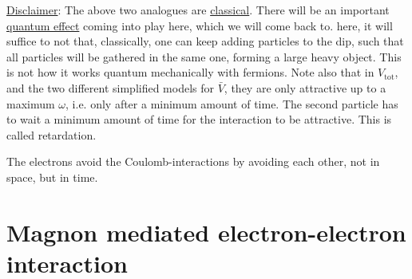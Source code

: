 \underline{Disclaimer}: The above two analogues are \underline{classical}. There will be an important \underline{quantum effect} coming into play here, which we will come back to. here, it will suffice to not that, classically, one can keep adding particles to the dip, such that all particles will be gathered in the same one, forming a large heavy object. This is not how it works quantum mechanically with fermions. Note also that in $V_{\text{tot}}$, and the two different simplified models for $\bar V$, they are only attractive up to a maximum $\omega$, i.e. only after a minimum amount of time. The second particle has to wait a minimum amount of time for the interaction to be attractive. This is called retardation. 
\begin{tcolorbox}
	The electrons avoid the Coulomb-interactions by avoiding each other, not in space, but in time. 
\end{tcolorbox}


\section[Magnons]{Magnon mediated electron-electron interaction}

